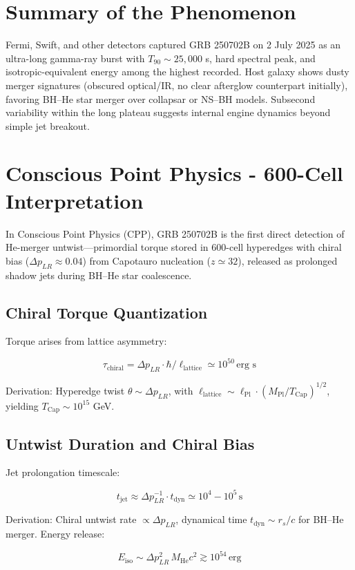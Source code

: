 \documentclass[11pt]{article}
\begin{document}
\section{Summary of the Phenomenon}
Fermi, Swift, and other detectors captured GRB 250702B on 2 July 2025 as an ultra-long gamma-ray burst with $T_{90} \sim 25,000$ s, hard spectral peak, and isotropic-equivalent energy among the highest recorded. Host galaxy shows dusty merger signatures (obscured optical/IR, no clear afterglow counterpart initially), favoring BH–He star merger over collapsar or NS–BH models. Subsecond variability within the long plateau suggests internal engine dynamics beyond simple jet breakout.

\section{Conscious Point Physics - 600-Cell Interpretation}
In Conscious Point Physics (CPP), GRB 250702B is the first direct detection of He-merger untwist—primordial torque stored in 600-cell hyperedges with chiral bias ($\Delta p_{LR} \approx 0.04$) from Capotauro nucleation ($z \simeq 32$), released as prolonged shadow jets during BH–He star coalescence.

\subsection{Chiral Torque Quantization}
Torque arises from lattice asymmetry:

\[
\tau_{\text{chiral}} = \Delta p_{LR} \cdot \hbar / \ell_{\text{lattice}} \simeq 10^{50} \, \text{erg s}
\]

Derivation: Hyperedge twist $\theta \sim \Delta p_{LR}$, with $\ell_{\text{lattice}} \sim \ell_{\text{Pl}} \cdot (M_{\text{Pl}} / T_{\text{Cap}})^{1/2}$, yielding $T_{\text{Cap}} \sim 10^{15}$ GeV.

\subsection{Untwist Duration and Chiral Bias}
Jet prolongation timescale:

\[
t_{\text{jet}} \approx \Delta p_{LR}^{-1} \cdot t_{\text{dyn}} \simeq 10^{4} - 10^{5} \, \text{s}
\]

Derivation: Chiral untwist rate $\propto \Delta p_{LR}$, dynamical time $t_{\text{dyn}} \sim r_s / c$ for BH–He merger. Energy release:

\[
E_{\text{iso}} \sim \Delta p_{LR}^2 \, M_{\text{He}} c^2 \gtrsim 10^{54} \, \text{erg}
\]
\end{document}
